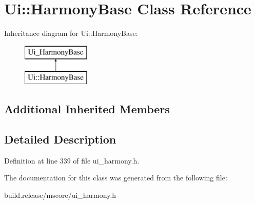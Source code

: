 \hypertarget{class_ui_1_1_harmony_base}{}\section{Ui\+:\+:Harmony\+Base Class Reference}
\label{class_ui_1_1_harmony_base}
Inheritance diagram for Ui\+:\+:Harmony\+Base\+:\begin{figure}[H]
\begin{center}
\leavevmode
\includegraphics[height=2.000000cm]{class_ui_1_1_harmony_base}
\end{center}
\end{figure}
\subsection*{Additional Inherited Members}


\subsection{Detailed Description}


Definition at line 339 of file ui\+\_\+harmony.\+h.



The documentation for this class was generated from the following file\+:\begin{DoxyCompactItemize}
\item 
build.\+release/mscore/ui\+\_\+harmony.\+h\end{DoxyCompactItemize}
